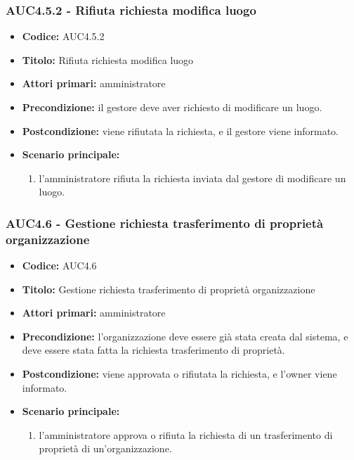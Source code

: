 \documentclass[casi-duso]{subfiles}
\begin{document}
\subsubsection{AUC4.5.2 - Rifiuta richiesta modifica luogo}%
\label{subsub:AUC4.5.2}
\begin{itemize}
  \item \textbf{Codice:} AUC4.5.2
  \item \textbf{Titolo:} Rifiuta richiesta modifica luogo
  \item \textbf{Attori primari:} amministratore
  \item \textbf{Precondizione:} il gestore deve aver richiesto di modificare un luogo.
  \item \textbf{Postcondizione:} viene rifiutata la richiesta, e il gestore viene informato.
  \item \textbf{Scenario principale:}
  \begin{enumerate}
    \item l'amministratore rifiuta la richiesta inviata dal gestore di modificare un luogo.
  \end{enumerate}
\end{itemize}

\subsubsection{AUC4.6 - Gestione richiesta trasferimento di proprietà organizzazione}%
\label{subsub:AUC4.6}
\begin{itemize}
  \item \textbf{Codice:} AUC4.6
  \item \textbf{Titolo:} Gestione richiesta trasferimento di proprietà organizzazione
  \item \textbf{Attori primari:} amministratore
  \item \textbf{Precondizione:} l'organizzazione deve essere già stata creata dal sistema, e deve essere stata fatta la richiesta trasferimento di proprietà.
  \item \textbf{Postcondizione:} viene approvata o rifiutata la richiesta, e l'owner viene informato.
  \item \textbf{Scenario principale:}
  \begin{enumerate}
    \item l'amministratore approva o rifiuta la richiesta di un trasferimento di proprietà di un'organizzazione.
  \end{enumerate}
\end{itemize}
\end{document}
